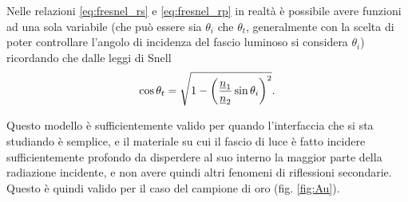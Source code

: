\documentclass[prb,showpacs,floatfix,altaffilletter,amsmath,amssymb,reprint,citeautoscript]{revtex4-1}
\begin{document}
Nelle relazioni \eqref{eq:fresnel_rs} e \eqref{eq:fresnel_rp} in realtà è possibile avere funzioni ad una sola variabile (che può essere sia $\theta_i$ che $\theta_t$, generalmente con la scelta di poter controllare l'angolo di incidenza del fascio luminoso si considera $\theta_i$) ricordando che dalle leggi di Snell \begin{equation}
    \cos\theta_t = \sqrt{1-\qty(\frac{\underline n_1}{\underline n_2}\sin\theta_i)^2}.
    \label{eq:snell}
\end{equation}

Questo modello è sufficientemente valido per quando l'interfaccia che si sta studiando è semplice, e il materiale su cui il fascio di luce è fatto incidere sufficientemente profondo da disperdere al suo interno la maggior parte della radiazione incidente, e non avere quindi altri fenomeni di riflessioni secondarie. Questo è quindi valido per il caso del campione di oro (fig. \ref{fig:Au}).
\end{document}
